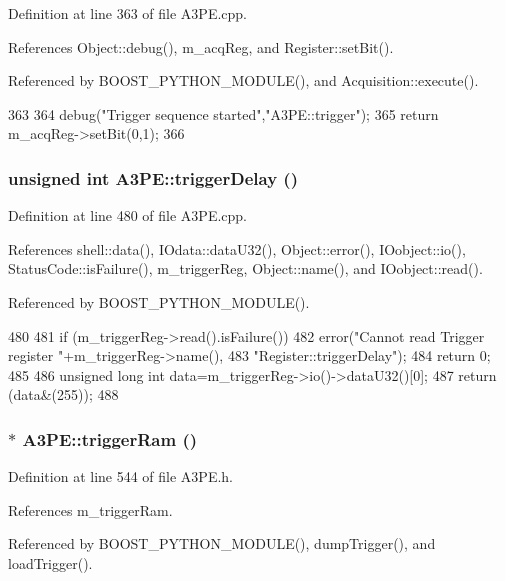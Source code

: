 Definition at line 363 of file A3PE.cpp.

References Object::debug(), m\_\-acqReg, and Register::setBit().

Referenced by BOOST\_\-PYTHON\_\-MODULE(), and Acquisition::execute().


\begin{DoxyCode}
363                         {
364   debug("Trigger sequence started","A3PE::trigger");
365   return m_acqReg->setBit(0,1);
366 }
\end{DoxyCode}
\hypertarget{classA3PE_ac0aabc1457923b7ee7da0a2c91c46451}{
\subsubsection[{triggerDelay}]{\setlength{\rightskip}{0pt plus 5cm}unsigned int A3PE::triggerDelay ()}}
\label{classA3PE_ac0aabc1457923b7ee7da0a2c91c46451}


Definition at line 480 of file A3PE.cpp.

References shell::data(), IOdata::dataU32(), Object::error(), IOobject::io(), StatusCode::isFailure(), m\_\-triggerReg, Object::name(), and IOobject::read().

Referenced by BOOST\_\-PYTHON\_\-MODULE().


\begin{DoxyCode}
480                                {
481   if (m_triggerReg->read().isFailure()){
482     error("Cannot read Trigger register "+m_triggerReg->name(),
483         "Register::triggerDelay");
484     return 0;
485   }
486   unsigned long int data=m_triggerReg->io()->dataU32()[0];
487   return (data&(255));
488 }
\end{DoxyCode}
\hypertarget{classA3PE_aad0f7ac467db22e5608ae6b0957665a1}{
\subsubsection[{triggerRam}]{$\ast$ A3PE::triggerRam ()}}
\label{classA3PE_aad0f7ac467db22e5608ae6b0957665a1}


Definition at line 544 of file A3PE.h.

References m\_\-triggerRam.

Referenced by BOOST\_\-PYTHON\_\-MODULE(), dumpTrigger(), and loadTrigger().


